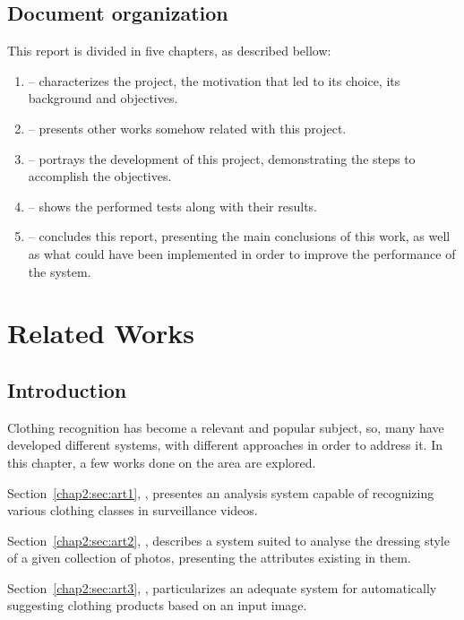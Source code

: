 \documentclass[titlepage,12pt,a4paper,times]{book}
\begin{document}
\section{Document organization}
\label{sec:organ}

This report is divided in five chapters, as described bellow:
\begin{enumerate}
	\item \textbf{} -- characterizes the project, the
		motivation that led to its choice, its background and objectives.
	\item \textbf{} -- presents other works somehow related
		with this project.
	\item \textbf{} -- portrays the development of this
		project, demonstrating the steps to accomplish the objectives.
	\item \textbf{} -- shows the performed tests along with
		their results.
	\item \textbf{} -- concludes this report, presenting the
		main conclusions of this work, as well as what could have been
		implemented in order to improve the performance of the system.
\end{enumerate}

\chapter{Related Works}
\label{chap:ow}

\section{Introduction}
\label{chap2:sec:intro}

Clothing recognition has become a relevant and popular subject, so, many have
developed different systems, with different approaches in order to address it.
In this chapter, a few works done on the area are explored.

Section~\ref{chap2:sec:art1}, , presentes an
analysis system capable of recognizing various clothing classes in surveillance
videos.

Section~\ref{chap2:sec:art2}, , describes a system
suited to analyse the dressing style of a given collection of photos,
presenting the attributes existing in them.

Section~\ref{chap2:sec:art3}, , particularizes an
adequate system for automatically suggesting clothing products based on an
input image.
\end{document}
